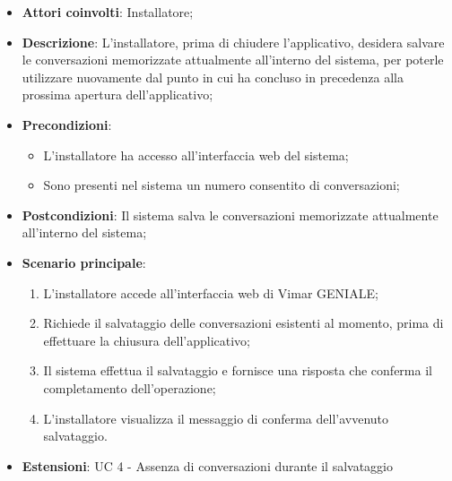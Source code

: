 \begin{itemize}
    \item \textbf{Attori coinvolti}: Installatore;
    \item \textbf{Descrizione}: L’installatore, prima di chiudere l’applicativo, desidera salvare le conversazioni memorizzate attualmente all’interno del sistema, per poterle utilizzare nuovamente dal punto in cui ha concluso in precedenza alla prossima apertura dell’applicativo;
    \item \textbf{Precondizioni}: 
        \begin{itemize}
            \item L’installatore ha accesso all’interfaccia web del sistema;
            \item Sono presenti nel sistema un numero consentito di conversazioni;
        \end{itemize}
    \item \textbf{Postcondizioni}: Il sistema salva le conversazioni memorizzate attualmente all’interno del sistema;
    \item \textbf{Scenario principale}:
    \begin{enumerate}
    \item L’installatore accede all’interfaccia web di Vimar GENIALE;
    \item Richiede il salvataggio delle conversazioni esistenti al momento, prima di effettuare la chiusura dell’applicativo;
    \item Il sistema effettua il salvataggio e fornisce una risposta che conferma il completamento dell’operazione;
    \item L’installatore visualizza il messaggio di conferma dell’avvenuto salvataggio.
    \end{enumerate}
    \item \textbf{Estensioni}: UC 4 - Assenza di conversazioni durante il salvataggio
\end{itemize}

